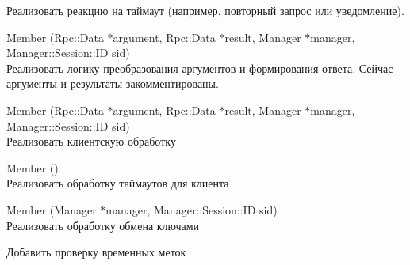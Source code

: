 \begin{DoxyRefList}
\label{todo__todo000021}%
%
Реализовать реакцию на таймаут (например, повторный запрос или уведомление).  
\item[Member \doxylink{class_g_n_e_t_1_1_get_user_coupon_a6fe67ac1c3e044ed8f94f8299894ed4b}{GNET\+::Get\+User\+Coupon\+::Server} (Rpc\+::\+Data \texorpdfstring{$\ast$}{*}argument, Rpc\+::\+Data \texorpdfstring{$\ast$}{*}result, Manager \texorpdfstring{$\ast$}{*}manager, Manager\+::\+Session\+::\+ID sid)]\hfill \\
\label{todo__todo000019}%
%
Реализовать логику преобразования аргументов и формирования ответа. Сейчас аргументы и результаты закомментированы.  
\item[Member \doxylink{class_g_n_e_t_1_1_g_query_passwd_a15c95c81230be5795439a7d9df0fe395}{GNET\+::GQuery\+Passwd\+::Client} (Rpc\+::\+Data \texorpdfstring{$\ast$}{*}argument, Rpc\+::\+Data \texorpdfstring{$\ast$}{*}result, Manager \texorpdfstring{$\ast$}{*}manager, Manager\+::\+Session\+::\+ID sid)]\hfill \\
\label{todo__todo000025}%
%
Реализовать клиентскую обработку  
\item[Member \doxylink{class_g_n_e_t_1_1_g_query_passwd_ae5668da612a602d47616af3169a73a41}{GNET\+::GQuery\+Passwd\+::On\+Timeout} ()]\hfill \\
\label{todo__todo000026}%
%
Реализовать обработку таймаутов для клиента  
\item[Member \doxylink{class_g_n_e_t_1_1_key_exchange_a59d9dff58cb00261d155d622d24af391}{GNET\+::Key\+Exchange\+::Process} (Manager \texorpdfstring{$\ast$}{*}manager, Manager\+::\+Session\+::\+ID sid)]\hfill \\
\label{todo__todo000027}%
%
Реализовать обработку обмена ключами 



Добавить проверку временных меток 




\end{DoxyRefList}

